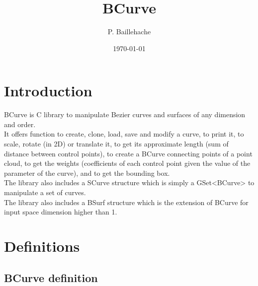 \documentclass[12pt, a4paper]{article}
\begin{document}
\title{BCurve}
\author{P. Baillehache}
\date{\today}
\maketitle

\tableofcontents

\section*{Introduction}

BCurve is C library to manipulate Bezier curves and surfaces of any dimension and order.\\ 

It offers function to create, clone, load, save and modify a curve, to print it, to scale, rotate (in 2D) or translate it, to get its approximate length (sum of distance between control points), to create a BCurve connecting points of a point cloud, to get the weights (coefficients of each control point given the value of the parameter of the curve), and to get the bounding box.\\ 

The library also includes a SCurve structure which is simply a GSet<BCurve> to manipulate a set of curves.\\

The library also includes a BSurf structure which is the extension of BCurve for input space dimension higher than 1.\\

\section{Definitions}

\subsection{BCurve definition}
\end{document}
